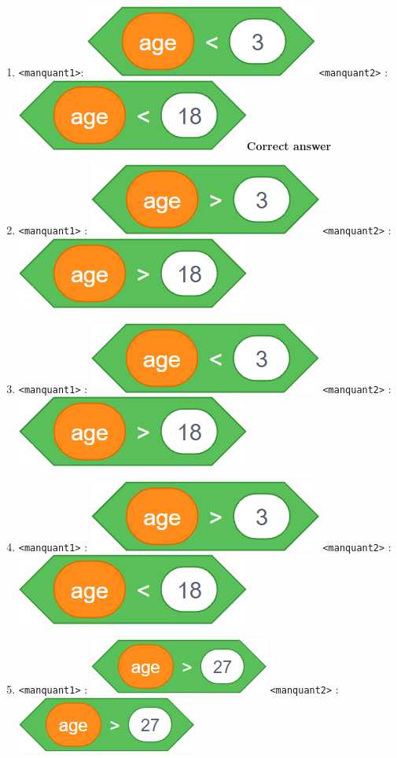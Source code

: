 \documentclass[14pt]{extarticle}
\begin{document}
\begin{enumerate}[label=\alph*)]
    \item \texttt{<manquant1>}: \includegraphics[width=0.2\linewidth]{images/pretest/_Q6_B.png} \texttt{<manquant2>} :   \includegraphics[width=0.2\linewidth]  {images/pretest/_Q6_C.png}\textbf{Correct answer}
    \item \texttt{<manquant1>} : \includegraphics[width=0.2\linewidth]{images/pretest/_Q6_A.png} \texttt{<manquant2>} :   \includegraphics[width=0.2\linewidth]{images/pretest/_Q6_D.png} 
    \item \texttt{<manquant1>} : \includegraphics[width=0.2\linewidth]{images/pretest/_Q6_B.png} \texttt{<manquant2>} :   \includegraphics[width=0.2\linewidth]{images/pretest/_Q6_D.png} 
    \item \texttt{<manquant1>} : \includegraphics[width=0.2\linewidth]{images/pretest/_Q6_A.png} \texttt{<manquant2>} :   \includegraphics[width=0.2\linewidth]{images/pretest/_Q6_C.png} 
    \item \texttt{<manquant1>} : \includegraphics[width=0.2\linewidth]{images/pretest/_Q6_E.png} \texttt{<manquant2>} :   \includegraphics[width=0.2\linewidth]{images/pretest/_Q6_E.png} 
\end{enumerate}
\end{document}
